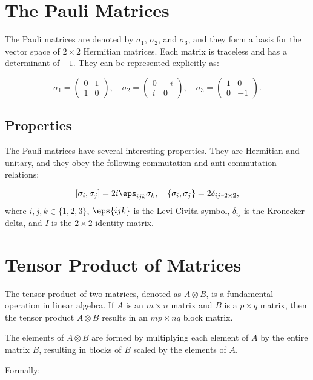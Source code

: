 \documentclass[12pt, a4paper]{article}
\begin{document}
\section{The Pauli Matrices}
The Pauli matrices are denoted by $\sigma_1$, $\sigma_2$, and $\sigma_3$, and they form a basis for the vector space of $2 \times 2$ Hermitian matrices. Each matrix is traceless and has a determinant of $-1$. They can be represented explicitly as:

\[
\sigma_1 = 
\begin{pmatrix}
0 & 1 \\
1 & 0
\end{pmatrix}, \quad
\sigma_2 = 
\begin{pmatrix}
0 & -i \\
i & 0
\end{pmatrix}, \quad
\sigma_3 = 
\begin{pmatrix}
1 & 0 \\
0 & -1
\end{pmatrix}.
\]

\subsection{Properties}
The Pauli matrices have several interesting properties. They are Hermitian and unitary, and they obey the following commutation and anti-commutation relations:

\[
[\sigma_i, \sigma_j] = 2i \eps_{ijk} \sigma_k, \quad
\{\sigma_i, \sigma_j\} = 2\delta_{ij} \mathbb{I}_{2\times 2},
\]
where $i, j, k \in \{1, 2, 3\}$, $\eps{ijk}$ is the Levi-Civita symbol, $\delta_{ij}$ is the Kronecker delta, and $I$ is the $2 \times 2$ identity matrix.

\section{Tensor Product of Matrices}

The tensor product of two matrices, denoted as \( A \otimes B \), is a fundamental operation in linear algebra. If \( A \) is an \( m \times n \) matrix and \( B \) is a \( p \times q \) matrix, then the tensor product \( A \otimes B \) results in an \( mp \times nq \) block matrix.

The elements of \( A \otimes B \) are formed by multiplying each element of \( A \) by the entire matrix \( B \), resulting in blocks of \( B \) scaled by the elements of \( A \).

Formally:
\end{document}
